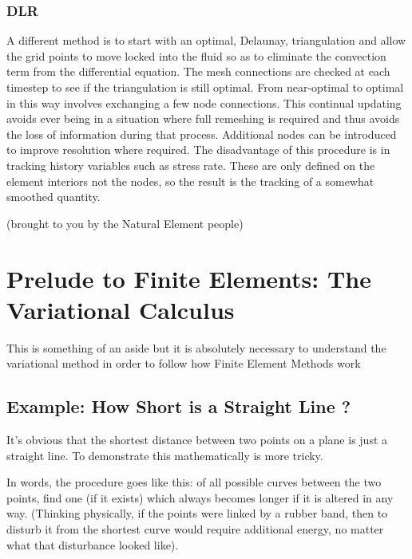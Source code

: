 \documentclass[10pt]{article}
\begin{document}
		\subsubsection{DLR}
	
			A different method is to start with an optimal, Delaunay, triangulation
			and allow the grid points to move locked into the fluid so as to eliminate
			the convection term from the differential equation. The mesh connections
			are checked at each timestep to see if the triangulation is still optimal.
			From near-optimal to optimal in this way involves exchanging a few 
			node connections. This continual updating avoids ever being in a 
			situation where full remeshing is required and thus avoids the loss of information during that
			process. Additional nodes can be introduced to improve resolution where required.
			The disadvantage of this procedure is in tracking history variables such as stress
			rate. These are only defined on the element interiors not the nodes, so the result is 
			the tracking of a somewhat smoothed quantity.
			
			(brought to you by the Natural Element people)
	
\section{Prelude to Finite Elements: The Variational Calculus}
	
	This is something of an aside but it is absolutely necessary to understand
	the variational method in order to follow how Finite Element Methods work

	\subsection{Example: How Short is a Straight Line ?}
	
	It's obvious that the shortest distance between two points on
	a plane is just a straight line. To demonstrate this mathematically
	is more tricky.
	
	In words, the procedure goes like this: of all possible curves between
	the two points, find  one (if it exists) which  always becomes longer
	if it is altered in any way.   (Thinking physically, if the points
	were linked by a rubber band, then to disturb it from the shortest 
	curve would require additional energy, no matter what that disturbance
	looked like).
	
\end{document}

